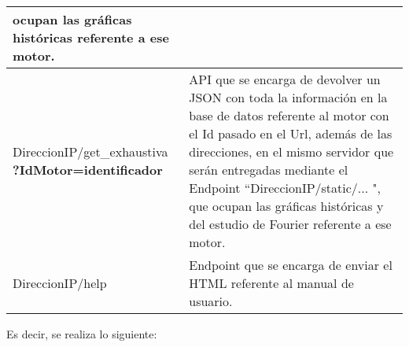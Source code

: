 \begin{table}[H]
\begin{center}
\begin{tabular}{|p{5cm}|p{10cm}|}
                ocupan las gráficas históricas referente a ese motor.
                \\\hline
                DireccionIP/get\_exhaustiva \textbf{?IdMotor=identificador}&
                API que se encarga de devolver un JSON con toda la información
                en la base de datos referente al motor con el Id pasado en el
                Url, además de las direcciones, en el mismo servidor que serán
                entregadas mediante el Endpoint ``DireccionIP/static/... ", que
                ocupan las gráficas históricas y del estudio de Fourier
                referente a ese motor.
                \\\hline
                DireccionIP/help&
                Endpoint que se encarga de enviar el HTML referente al manual
                de usuario.
                \\\hline
            \end{tabular}

        \end{center}

    \end{table}

    Es decir, se realiza lo siguiente:

